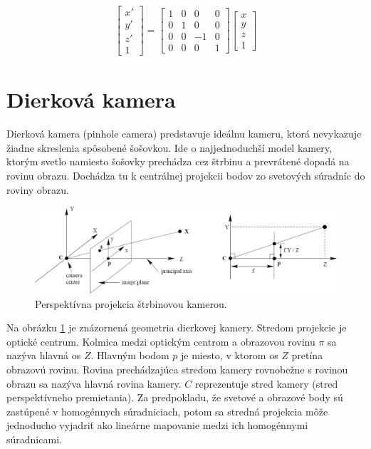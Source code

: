 \begin{equation}
\label{eq_kalib_sumer_z}
\begin{aligned}
\begin{bmatrix}
x' \\ y' \\ z' \\ 1 
\end{bmatrix}
=
\begin{bmatrix}
1 & 0 & 0 & 0 \\
0 & 1 & 0 & 0 \\
0 & 0 & -1 & 0 \\
0 & 0 & 0 & 1 
\end{bmatrix}
\begin{bmatrix}
x \\ y \\ z \\ 1 
\end{bmatrix}
\end{aligned}
\end{equation}




\section{Dierková kamera}
Dierková kamera (pinhole camera) predstavuje ideálnu kameru, ktorá nevykazuje žiadne skreslenia spôsobené šošovkou. Ide o najjednoduchší model kamery, ktorým svetlo namiesto šošovky prechádza cez štrbinu a prevrátené dopadá na rovinu obrazu. Dochádza tu k centrálnej projekcii bodov zo svetových súradníc do roviny obrazu.

\begin{figure}[h]
	\centering
	\includegraphics[width=\textwidth]{figures/pinhole_camera.jpg} 
	\caption{Perspektívna projekcia štrbinovou kamerou.}
	\label{fig:pinhole_camera}
\end{figure}

Na obrázku \ref{fig:pinhole_camera} je znázornená geometria dierkovej kamery. Stredom projekcie je optické centrum. Kolmica medzi optickým centrom a obrazovou rovinu $\pi$ sa nazýva hlavná os $Z$. Hlavným bodom $p$ je miesto, v ktorom os $Z$ pretína obrazovú rovinu. Rovina prechádzajúca stredom kamery rovnobežne s rovinou obrazu sa nazýva hlavná rovina kamery. $C$ reprezentuje stred kamery (stred perspektívneho premietania). Za predpokladu, že svetové a obrazové body sú zastúpené v homogénnych súradniciach, potom sa stredná projekcia môže jednoducho vyjadriť ako lineárne mapovanie medzi ich homogénnymi súradnicami.

